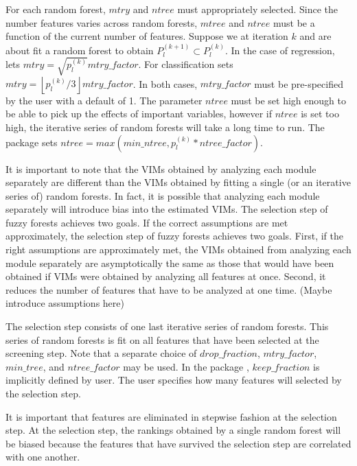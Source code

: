 \documentclass[article,shortnames]{jss}
\begin{document}
For each random forest, $mtry$ and $ntree$ must appropriately selected.  Since the number features varies across random forests, $mtree$
and $ntree$ must be a function of the current number of features.   Suppose we at iteration $k$ and are about fit a random forest to obtain
$P_{l}^{(k+1)}\subset P_{l}^{(k)}$.  In the case of regression,  lets $mtry=\sqrt{p^{(k)}_{l}}mtry\_factor$.  For classification 
 sets $mtry=\left\lfloor p^{(k)}_{l}/3 \right\rfloor mtry\_factor$.  In both cases, $mtry\_factor$ must be pre-specified by the user
with a default of 1.  The parameter $ntree$ must be set high enough to be able to pick up the effects
of important variables, however if $ntree$ is set too high, the iterative series of random forests will take a long time to run.  The package  sets $ntree=max(min\_ntree,p^{(k)}_{l}*ntree\_factor)$.

It is important to note that the VIMs obtained by analyzing each module separately are different than the VIMs obtained
by fitting a single (or an iterative series of) random forests.  In fact, it is possible that analyzing each module separately 
will introduce bias into the estimated VIMs. 
The selection step of fuzzy forests achieves two goals.   
If the correct assumptions are met approximately, the selection step of fuzzy forests achieves two goals.  First, if the right assumptions are 
approximately met, the VIMs obtained from analyzing each module separately are asymptotically the same as those that 
would have been obtained if VIMs were obtained by analyzing all features at once. Second, it reduces the number of features that 
have to be analyzed at one time.  (Maybe introduce assumptions here)
 
The selection step consists of one last iterative series of random forests. This series of random forests is fit on all features that have
been selected at the screening step.  Note that a separate choice of $drop\_fraction$, $mtry\_factor$, $min\_tree$,
and $ntree\_factor$ may be used.  In the package , $keep\_fraction$ is implicitly defined by user.  The user specifies 
how many features will selected by the selection step.  

It is important that features are eliminated in stepwise fashion at the selection step.  At the selection step, the rankings obtained by
a single random forest will be biased because the features that have survived the selection step are correlated with one another.



     
    


\end{document}
